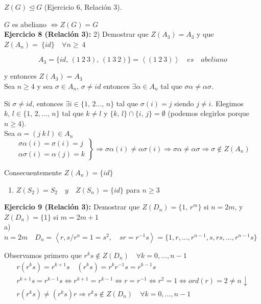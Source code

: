 \documentclass{article}
\begin{document}
$Z(G)\unlhd G$ (Ejercicio 6, Relación 3).

$G$ es abeliano $\Leftrightarrow Z(G)=G$ \\

\textbf{Ejercicio 8 (Relación 3):} 2) Demostrar que $Z(A_3)=A_3$ y que $Z(A_n)=~\{id\} \quad \forall n \geq~4$

\begin{equation*}
A_3=\{id,\,(1\:2\:3),\,(1\:3\:2)\}=\left\langle (1\:2\:3)\right\rangle \quad es \quad abeliano
\end{equation*}

y entonces $Z(A_3)=A_3$ \\

Sea $n\geq 4$ y sea $\sigma \in A_n$, $\sigma \neq id$ entonces $\exists \alpha \in A_n$ tal que $\sigma \alpha \neq \alpha \sigma$.

Si $\sigma \neq id$, entonces $\exists i\in \{1,\,2\ldots,\,n\}$ tal que $\sigma(i)=j$ siendo $j\neq i$. Elegimos $k,\,l\in \{1,\,2,\ldots,\,n\}$ tal que $k\neq l$ y $\{k,\,l\}\cap \{i,\,j\}=\emptyset$ (podemos elegirlos porque $n\geq 4$). \\

Sea $\alpha=(j\:k\:l)\in A_n$
\begin{equation*}
\left. \begin{array}{c}
\sigma \alpha(i)=\sigma(i)=j\\
\alpha \sigma(i)=\alpha(j)=k
\end{array} \right\rbrace \Rightarrow \sigma\alpha(i)\neq \alpha\sigma(i)\Rightarrow \sigma\alpha\neq\alpha\sigma \Rightarrow \sigma\notin Z(A_n)
\end{equation*}

Consecuentemente $Z(A_n)=\{id\}$

\begin{enumerate}[1)]
\item $Z(S_2)=S_2\quad y \quad Z(S_n)=\{id\}$ para $n\geq 3$
\end{enumerate}

\textbf{Ejercicio 9 (Relación 3):} Demostrar que $Z(D_n)=\{1,\,r^m\}$ si $n=2m$, y $Z(D_n)=\{1\}$ si $m=2m+1$\\

a) $n=2m\quad D_n=\left\langle r,s/r^n=1=s^2,\quad sr=r^{-1}s\right\rangle=\{1,r,\ldots,r^{n-1},s,rs,\ldots,r^{n-1}s\}$

Observamos primero que $r^ks\notin Z(D_n) \quad \forall k=0,\ldots,n-1$
\begin{gather*}
r(r^ks)=r^{k+1}s \quad (r^ks)=r^kr^{-1}s=r^{k-1}s \\
r^{k+1}s=r^{k-1}s\Leftrightarrow r^{k+1}=r^{k-1} \Leftrightarrow r=r^{-1} \Leftrightarrow r^2=1 \Leftrightarrow ord(r)=2\neq n \downarrow \\
r(r^ks)\neq (r^ks)r \Rightarrow r^ks\notin Z(D_n) \quad \forall k=0,\ldots,n-1
\end{gather*}
\end{document}
